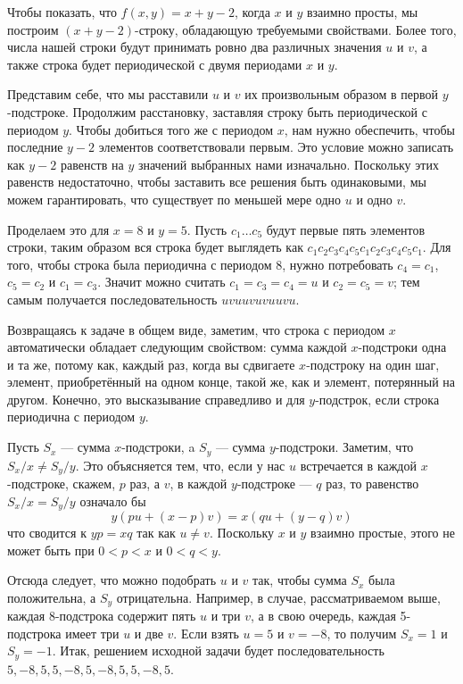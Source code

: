 Чтобы показать, что $f(x,y)=x+y-2$,  когда $x$  и $y$ взаимно просты, мы построим $(x+y-2)$-строку, обладающую требуемыми свойствами.
Более того, числа нашей строки будут принимать ровно два различных значения $u$ и $v$,
а также строка будет периодической с двумя периодами $x$ и $y$. 

Представим себе, что мы расставили $u$ и $v$ их произвольным образом в первой $y$-подстроке.
Продолжим расстановку, заставляя строку быть периодической с периодом $y$.
Чтобы добиться того же с периодом $x$,
нам нужно обеспечить, чтобы последние  $y-2$ элементов соответствовали первым.
Это условие можно записать как $y-2$ равенств на $y$ значений выбранных нами изначально. 
Поскольку  этих  равенств недостаточно, чтобы заставить все решения быть одинаковыми, мы можем гарантировать, что существует по меньшей мере одно $u$ и одно $v$.

Проделаем это для $x=8$ и $y=5$.
Пусть $c_1\dots c_5$ будут первые пять элементов строки, 
таким образом вся строка будет выглядеть как
$c_1c_2c_3c_4c_5c_1c_2c_3c_4c_5c_1$. 
Для того, чтобы строка была периодична с периодом 8, 
нужно потребовать $c_4=c_1$, $c_5=c_2$ и $c_1=c_3$. 
Значит можно считать $c_1=c_3=c_4=u$ и $c_2=c_5=v$;  
тем самым получается последовательность $uvuuvuvuuvu$.


Возвращаясь к задаче в общем виде, 
заметим, что строка с периодом $x$ автоматически обладает следующим свойством:  сумма каждой $x$-подстроки одна и та же, потому как, каждый раз, когда вы сдвигаете $x$-подстроку на один шаг,  элемент, приобретённый на одном конце, такой же, как и элемент,  потерянный на  другом.
Конечно, это высказывание справедливо и для $y$-подстрок, если строка периодична с периодом $y$.

Пусть  $S_x$ --- сумма $x$-подстроки,  a $S_y$ --- сумма $y$-подстроки. 
Заметим, что $S_x/x\ne S_y/y$.
Это объясняется тем,  что, если у нас $u$ встречается в каждой
 $x$-подстроке,  скажем, $p$ раз,  а $v$, в каждой $y$-подстроке --- $q$ раз, 
 то равенство $S_x/x=S_y/y$
 означало бы  
\[y(pu+(x-p)v)=x(qu+(y-q)v)\]
что сводится к $yp=xq$ так как $u\ne v$.  
Поскольку $x$ и $y$ взаимно простые, этого не может быть при $0<p<x$ и $0<q<y$.


Отсюда следует, что можно подобрать $u$ и $v$ так, чтобы сумма $S_x$ была положительна, а $S_y$ отрицательна. 
Например, в случае, рассматриваемом выше,  каждая 8-подстрока содержит пять $u$ и  три $v$, 
а в свою очередь, каждая 5-подстрока имеет три $u$ и две $v$.
Если взять $u=5$ и $v=-8$,  то получим $S_x=1$   и $S_y=-1$.  
Итак, решением исходной задачи будет последовательность  $5,-8,5,5,-8,5,-8,5,5,-8,5$.
\heart

